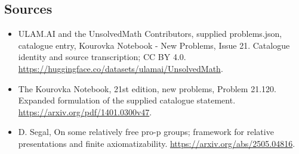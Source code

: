 \documentclass[11pt,a4paper]{article}
\begin{document}
\subsection{Sources}
\begin{itemize}
\item[S1] ULAM.AI and the UnsolvedMath Contributors, supplied problems.json, catalogue entry, Kourovka Notebook - New Problems, Issue 21. Catalogue identity and source transcription; CC BY 4.0.
\url{https://huggingface.co/datasets/ulamai/UnsolvedMath}.
\item[S2] The Kourovka Notebook, 21st edition, new problems, Problem 21.120. Expanded formulation of the supplied catalogue statement.
\url{https://arxiv.org/pdf/1401.0300v47}.
\item[S3] D. Segal, On some relatively free pro-p groups; framework for relative presentations and finite axiomatizability.
\url{https://arxiv.org/abs/2505.04816}.
\end{itemize}
\end{document}
